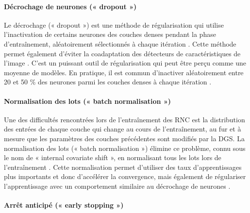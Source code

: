 \paragraph{Décrochage de neurones (« dropout ») }

Le décrochage (« dropout ») est une méthode de régularisation qui utilise l’inactivation de certains neurones des couches denses pendant la phase d’entraînement, aléatoirement sélectionnés à chaque itération \citep{srivastava_dropout_2014}. Cette méthode permet également d’éviter la coadaptation des détecteurs de caractéristiques de l’image \citep{hinton_improving_2012}. C’est un puissant outil de régularisation qui peut être perçu comme une moyenne de modèles. En pratique, il est commun d’inactiver aléatoirement entre 20 et 50 \% des neurones parmi les couches denses à chaque itération \citep{aggarwal_neural_2018}.

\paragraph{Normalisation des lots (« batch normalisation »)}

Une des difficultés rencontrées lors de l’entraînement des RNC est la distribution des entrées de chaque couche qui change au cours de l’entraînement, au fur et à mesure que les paramètres des couches précédentes sont modifiés par la DGS. La normalisation des lots (« batch normalisation ») élimine ce problème, connu sous le nom de « internal covariate shift », en normalisant tous les lots lors de l’entraînement \citep{ioffe_batch_2015}. Cette normalisation permet d’utiliser des taux d’apprentissages plus importants et donc d’accélérer la convergence, mais également de régulariser l’apprentissage \citep{luo_towards_2019} avec un comportement similaire au décrochage de neurones \citep{szegedy_going_2015}.

\paragraph{Arrêt anticipé (« early stopping »)}


